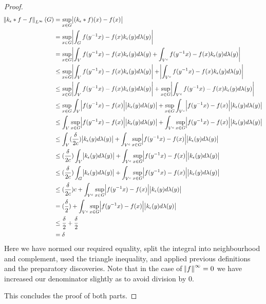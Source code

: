 \begin{proof}
\begin{align*}
\norm{k_\epsilon \ast f -f}_{L^\infty}(G) &= \sup_{x\in G} \abs{(k_\epsilon \ast f)(x)-f(x)} \\
&= \sup_{x\in G} \abs{\int_G f(y^{-1}x)-f(x) k_\epsilon(y) d\lambda(y)}\\
&= \sup_{x\in G} \abs{\int_V f(y^{-1}x)-f(x) k_\epsilon(y) d\lambda(y) + \int_{V^c} f(y^{-1}x)-f(x) k_\epsilon(y) d\lambda(y)}\\
&\leq \sup_{x\in G} \abs{\int_V f(y^{-1}x)-f(x) k_\epsilon(y) d\lambda(y)} + \abs{\int_{V^c} f(y^{-1}x)-f(x) k_\epsilon(y) d\lambda(y)} \\
&\leq \sup_{x\in G} \abs{\int_V f(y^{-1}x)-f(x) k_\epsilon(y) d\lambda(y)} + \sup_{x\in G} \abs{\int_{V^c} f(y^{-1}x)-f(x) k_\epsilon(y) d\lambda(y)} \\
&\leq \sup_{x\in G} \int_V \abs{f(y^{-1}x)-f(x)}\abs{ k_\epsilon(y) d\lambda(y)} + \sup_{x\in G} \int_{V^c}\abs{ f(y^{-1}x)-f(x)}\abs{ k_\epsilon(y) d\lambda(y)}\\
&\leq  \int_V \sup_{x\in G}\abs{f(y^{-1}x)-f(x)}\abs{ k_\epsilon(y) d\lambda(y)} +  \int_{V^c}\sup_{x\in G}\abs{ f(y^{-1}x)-f(x)}\abs{ k_\epsilon(y) d\lambda(y)}\\
&\leq  \int_V (\frac{\delta}{2c}) \abs{ k_\epsilon(y) d\lambda(y)} +  \int_{V^c}\sup_{x\in G}\abs{ f(y^{-1}x)-f(x)}\abs{ k_\epsilon(y) d\lambda(y)}\\
&\leq (\frac{\delta}{2c}) \int_V  \abs{ k_\epsilon(y) d\lambda(y)} +  \int_{V^c}\sup_{x\in G}\abs{ f(y^{-1}x)-f(x)}\abs{ k_\epsilon(y) d\lambda(y)}\\
&\leq (\frac{\delta}{2c}) \int_G  \abs{ k_\epsilon(y) d\lambda(y)} +  \int_{V^c}\sup_{x\in G}\abs{ f(y^{-1}x)-f(x)}\abs{ k_\epsilon(y) d\lambda(y)}\\
&\leq (\frac{\delta}{2c}) c +  \int_{V^c}\sup_{x\in G}\abs{ f(y^{-1}x)-f(x)}\abs{ k_\epsilon(y) d\lambda(y)}\\
&= (\frac{\delta}{2}) +  \int_{V^c}\sup_{x\in G}\abs{ f(y^{-1}x)-f(x)}\abs{ k_\epsilon(y) d\lambda(y)}\\
&\leq \frac{\delta}{2} + \frac{\delta}{2} \\
&= \delta
\end{align*}
Here we have normed our required equality, split the integral into neighbourhood and complement, used the triangle inequality, and applied previous definitions and the preparatory discoveries. Note that in the case of $\norm{f}^\infty = 0$ we have increased our denominator slightly as to avoid division by $0$.

This concludes the proof of both parts.
\end{proof}

